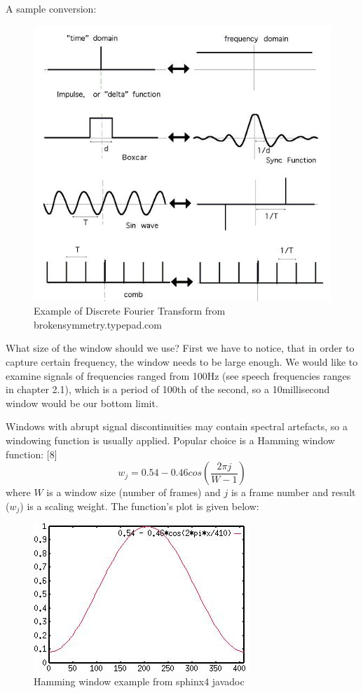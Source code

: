 \documentclass[12pt,a4paper,english]{article}
\begin{document}
\newpage
A sample conversion:
\begin{figure}[hb]
    \centering
    \includegraphics[scale=0.3]{sample_dft_conversion.jpg}
    \caption[]{Example of Discrete Fourier Transform from brokensymmetry.typepad.com}
\end{figure}

What size of the window should we use? First we have to notice, that in order to capture certain frequency, the window needs to be large enough. We would like to examine signals of frequencies ranged from 100Hz (see speech frequencies ranges in chapter 2.1), which is a period of 100th of the second, so a 10millisecond window would be our bottom limit. \newline

Windows with abrupt signal discontinuities may contain spectral artefacts, so a windowing function is usually applied. Popular choice is a Hamming window function: [8]
\begin{equation}
   w_j = 0.54 - 0.46 cos(\frac{2 \pi j}{W - 1}) 
\end{equation}
where $W$ is a window size (number of frames) and $j$ is a frame number and result ($w_j$) is a scaling weight.
The function's plot is given below:
\begin{figure}[hb]
    \centering
    \includegraphics[scale=0.5]{hamming_window.jpg}
    \caption[]{Hamming window example from sphinx4 javadoc}
\end{figure}
\end{document}
